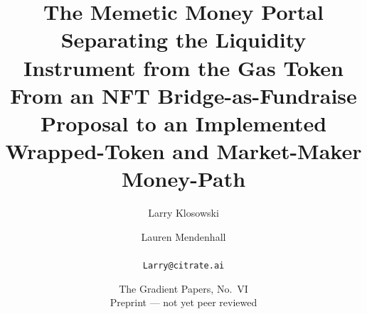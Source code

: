 
\title{\textbf{The Memetic Money Portal}\\[3pt]
\large Separating the Liquidity Instrument from the Gas Token\\[2pt]
\normalsize From an NFT Bridge-as-Fundraise Proposal to an Implemented Wrapped-Token and Market-Maker Money-Path}
\author{Larry Klosowski \and Lauren Mendenhall\\[2pt]\CitrateAffil\\ \texttt{Larry@citrate.ai}}
\date{The Gradient Papers, No.~VI \\ Preprint --- not yet peer reviewed}
\maketitle
